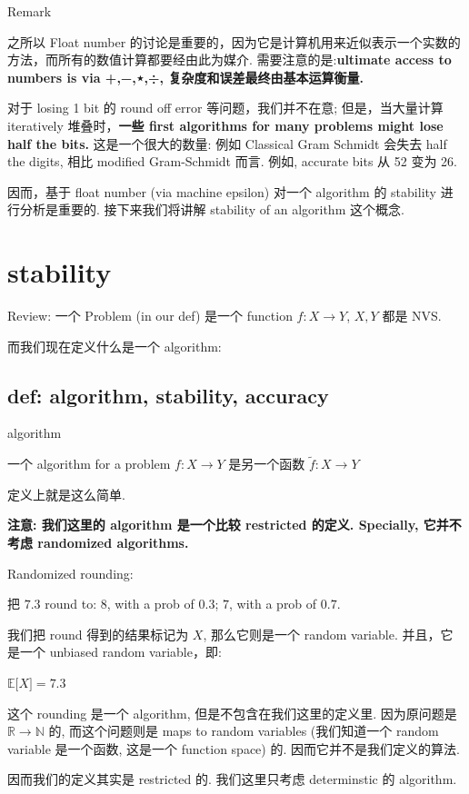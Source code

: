 \begin{qlremark}{Remark}

之所以 Float number 的讨论是重要的，因为它是计算机用来近似表示一个实数的方法，而所有的数值计算都要经由此为媒介. 需要注意的是:\textbf{ultimate access to numbers is via +,−,⋆,÷, 复杂度和误差最终由基本运算衡量.}

对于 losing 1 bit 的 round off error 等问题，我们并不在意; 但是，当大量计算 iteratively 堆叠时，\textbf{一些 first algorithms for many problems might lose half the bits.} 这是一个很大的数量: 例如 Classical Gram Schmidt 会失去 half the digits, 相比 modified Gram-Schmidt 而言. 例如, accurate bits 从 52 变为 26.

因而，基于 float number (via machine epsilon) 对一个 algorithm 的 stability 进行分析是重要的. 接下来我们将讲解 stability of an algorithm 这个概念.

\end{qlremark}

\section{stability}

Review: 一个 Problem (in our def) 是一个 function \(f:X\rightarrow Y\), \(X,Y\) 都是 NVS.

而我们现在定义什么是一个 algorithm:

\subsection{def: algorithm, stability, accuracy}

\begin{definition}{algorithm}

一个 algorithm for a problem \(f:X\rightarrow Y\) 是另一个函数 \(\widetilde{f}:X\rightarrow Y\)

\end{definition}

定义上就是这么简单.

\textbf{注意: 我们这里的 algorithm 是一个比较 restricted 的定义. Specially, 它并不考虑 randomized algorithms.}

\begin{example}

Randomized rounding:

把 \(7.3\) round to: 8, with a prob of \(0.3\); \(7\), with a prob of \(0.7\).

我们把 round 得到的结果标记为 \(X\), 那么它则是一个 random variable. 并且，它是一个 unbiased random variable，即:

\(\mathbb{E}\lbrack X\rbrack = 7.3\)

这个 rounding 是一个 algorithm, 但是不包含在我们这里的定义里. 因为原问题是 \(\mathbb{R}\rightarrow\mathbb{N}\) 的, 而这个问题则是 maps to random variables (我们知道一个 random variable 是一个函数, 这是一个 function space) 的. 因而它并不是我们定义的算法.

因而我们的定义其实是 restricted 的. 我们这里只考虑 determinstic 的 algorithm.

\end{example}

